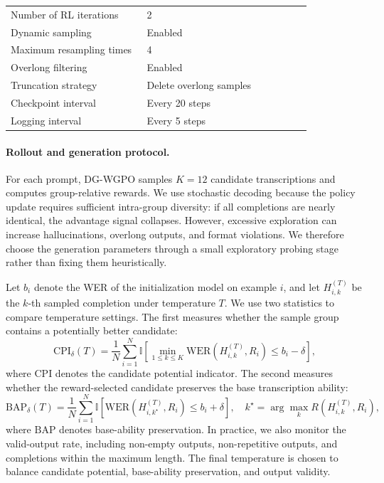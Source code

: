 \documentclass{article}
\begin{document}
\begin{table}[t]
\begin{tabular}{p{0.38\linewidth} p{0.46\linewidth}}
Number of RL iterations
& 2 \\

Dynamic sampling
& Enabled \\

Maximum resampling times
& 4 \\

Overlong filtering
& Enabled \\

Truncation strategy
& Delete overlong samples \\

Checkpoint interval
& Every 20 steps \\

Logging interval
& Every 5 steps \\
\bottomrule
\end{tabular}
\vspace{-2mm}
\end{table}

\paragraph{Rollout and generation protocol.}
For each prompt, DG-WGPO samples $K=12$ candidate transcriptions and computes
group-relative rewards. We use stochastic decoding because the policy update
requires sufficient intra-group diversity: if all completions are nearly
identical, the advantage signal collapses. However, excessive exploration can
increase hallucinations, overlong outputs, and format violations. We therefore
choose the generation parameters through a small exploratory probing stage rather
than fixing them heuristically.

Let $b_i$ denote the WER of the initialization model on example $i$, and let
$H_{i,k}^{(T)}$ be the $k$-th sampled completion under temperature $T$. We use two
statistics to compare temperature settings. The first measures whether the sample
group contains a potentially better candidate:
\begin{equation}
\mathrm{CPI}_{\delta}(T)
=
\frac{1}{N}
\sum_{i=1}^{N}
\mathbb{I}
\left[
\min_{1 \leq k \leq K}
\mathrm{WER}\!\left(H_{i,k}^{(T)}, R_i\right)
\leq b_i - \delta
\right],
\end{equation}
where $\mathrm{CPI}$ denotes the candidate potential indicator. The second
measures whether the reward-selected candidate preserves the base transcription
ability:
\begin{equation}
\mathrm{BAP}_{\delta}(T)
=
\frac{1}{N}
\sum_{i=1}^{N}
\mathbb{I}
\left[
\mathrm{WER}\!\left(H_{i,k^\star}^{(T)}, R_i\right)
\leq b_i + \delta
\right],
\quad
k^\star = \arg\max_{k} R\!\left(H_{i,k}^{(T)}, R_i\right),
\end{equation}
where $\mathrm{BAP}$ denotes base-ability preservation. In practice, we also
monitor the valid-output rate, including non-empty outputs, non-repetitive
outputs, and completions within the maximum length. The final temperature is
chosen to balance candidate potential, base-ability preservation, and output
validity.
\end{document}
